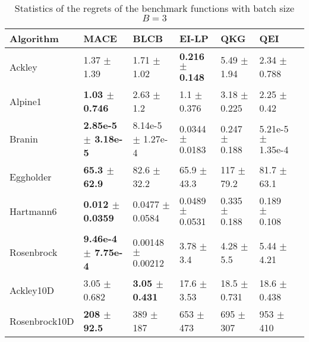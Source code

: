 \begin{table*}[!htb]
    \centering
    \caption{Statistics of the regrets of the benchmark functions with batch size $B=3$}
    \label{tab:result_analytical_b3}
    \begin{tabular}{lllllll}
        \toprule
        Algorithm     & MACE                             & BLCB                       & EI-LP                        & QKG                    & QEI                              \\ 
        \midrule
        Ackley        & 1.37            $\pm$  1.39      &  1.71         $\pm$  1.02    &  \textbf{0.216 $\pm$  0.148}  &  5.49   $\pm$  1.94   &  2.34      $\pm$  0.788     \\
        Alpine1       & \textbf{1.03    $\pm$  0.746}    &  2.63         $\pm$  1.2     &  1.1           $\pm$  0.376   &  3.18   $\pm$  0.225  &  2.25      $\pm$  0.42      \\
        Branin        & \textbf{2.85e-5 $\pm$  3.18e-5}  &  8.14e-5      $\pm$  1.27e-4 &  0.0344        $\pm$  0.0183  &  0.247  $\pm$  0.188  &  5.21e-5   $\pm$  1.35e-4   \\
        Eggholder     & \textbf{65.3    $\pm$  62.9}     &  82.6         $\pm$  32.2    &  65.9          $\pm$  43.3    &  117    $\pm$  79.2   &  81.7      $\pm$  63.1      \\
        Hartmann6     & \textbf{0.012   $\pm$  0.0359}   &  0.0477       $\pm$  0.0584  &  0.0489        $\pm$  0.0531  &  0.335  $\pm$  0.188  &  0.189     $\pm$  0.108     \\
        Rosenbrock    & \textbf{9.46e-4 $\pm$  7.75e-4}  &  0.00148      $\pm$  0.00212 &  3.78          $\pm$  3.4     &  4.28   $\pm$  5.5    &  5.44      $\pm$  4.21      \\
        Ackley10D     & 3.05            $\pm$  0.682     &  \textbf{3.05 $\pm$  0.431}  &  17.6          $\pm$  3.53    &  18.5   $\pm$  0.731  &  18.6      $\pm$  0.438     \\
        Rosenbrock10D & \textbf{208     $\pm$  92.5}     &  389          $\pm$  187     &  653           $\pm$  473     &  695    $\pm$  307    &  953       $\pm$  410       \\
        \bottomrule
    \end{tabular}
\end{table*}

